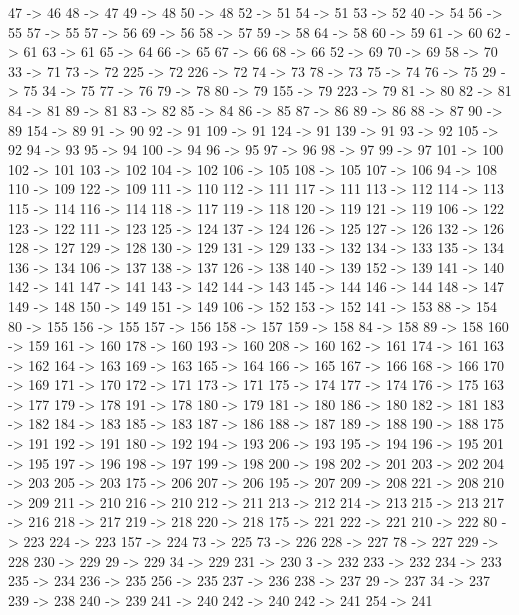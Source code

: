 {	47 -> 46
	48 -> 47
	49 -> 48
	50 -> 48
	52 -> 51
	54 -> 51
	53 -> 52
	40 -> 54
	56 -> 55
	57 -> 55
	57 -> 56
	69 -> 56
	58 -> 57
	59 -> 58
	64 -> 58
	60 -> 59
	61 -> 60
	62 -> 61
	63 -> 61
	65 -> 64
	66 -> 65
	67 -> 66
	68 -> 66
	52 -> 69
	70 -> 69
	58 -> 70
	33 -> 71
	73 -> 72
	225 -> 72
	226 -> 72
	74 -> 73
	78 -> 73
	75 -> 74
	76 -> 75
	29 -> 75
	34 -> 75
	77 -> 76
	79 -> 78
	80 -> 79
	155 -> 79
	223 -> 79
	81 -> 80
	82 -> 81
	84 -> 81
	89 -> 81
	83 -> 82
	85 -> 84
	86 -> 85
	87 -> 86
	89 -> 86
	88 -> 87
	90 -> 89
	154 -> 89
	91 -> 90
	92 -> 91
	109 -> 91
	124 -> 91
	139 -> 91
	93 -> 92
	105 -> 92
	94 -> 93
	95 -> 94
	100 -> 94
	96 -> 95
	97 -> 96
	98 -> 97
	99 -> 97
	101 -> 100
	102 -> 101
	103 -> 102
	104 -> 102
	106 -> 105
	108 -> 105
	107 -> 106
	94 -> 108
	110 -> 109
	122 -> 109
	111 -> 110
	112 -> 111
	117 -> 111
	113 -> 112
	114 -> 113
	115 -> 114
	116 -> 114
	118 -> 117
	119 -> 118
	120 -> 119
	121 -> 119
	106 -> 122
	123 -> 122
	111 -> 123
	125 -> 124
	137 -> 124
	126 -> 125
	127 -> 126
	132 -> 126
	128 -> 127
	129 -> 128
	130 -> 129
	131 -> 129
	133 -> 132
	134 -> 133
	135 -> 134
	136 -> 134
	106 -> 137
	138 -> 137
	126 -> 138
	140 -> 139
	152 -> 139
	141 -> 140
	142 -> 141
	147 -> 141
	143 -> 142
	144 -> 143
	145 -> 144
	146 -> 144
	148 -> 147
	149 -> 148
	150 -> 149
	151 -> 149
	106 -> 152
	153 -> 152
	141 -> 153
	88 -> 154
	80 -> 155
	156 -> 155
	157 -> 156
	158 -> 157
	159 -> 158
	84 -> 158
	89 -> 158
	160 -> 159
	161 -> 160
	178 -> 160
	193 -> 160
	208 -> 160
	162 -> 161
	174 -> 161
	163 -> 162
	164 -> 163
	169 -> 163
	165 -> 164
	166 -> 165
	167 -> 166
	168 -> 166
	170 -> 169
	171 -> 170
	172 -> 171
	173 -> 171
	175 -> 174
	177 -> 174
	176 -> 175
	163 -> 177
	179 -> 178
	191 -> 178
	180 -> 179
	181 -> 180
	186 -> 180
	182 -> 181
	183 -> 182
	184 -> 183
	185 -> 183
	187 -> 186
	188 -> 187
	189 -> 188
	190 -> 188
	175 -> 191
	192 -> 191
	180 -> 192
	194 -> 193
	206 -> 193
	195 -> 194
	196 -> 195
	201 -> 195
	197 -> 196
	198 -> 197
	199 -> 198
	200 -> 198
	202 -> 201
	203 -> 202
	204 -> 203
	205 -> 203
	175 -> 206
	207 -> 206
	195 -> 207
	209 -> 208
	221 -> 208
	210 -> 209
	211 -> 210
	216 -> 210
	212 -> 211
	213 -> 212
	214 -> 213
	215 -> 213
	217 -> 216
	218 -> 217
	219 -> 218
	220 -> 218
	175 -> 221
	222 -> 221
	210 -> 222
	80 -> 223
	224 -> 223
	157 -> 224
	73 -> 225
	73 -> 226
	228 -> 227
	78 -> 227
	229 -> 228
	230 -> 229
	29 -> 229
	34 -> 229
	231 -> 230
	3 -> 232
	233 -> 232
	234 -> 233
	235 -> 234
	236 -> 235
	256 -> 235
	237 -> 236
	238 -> 237
	29 -> 237
	34 -> 237
	239 -> 238
	240 -> 239
	241 -> 240
	242 -> 240
	242 -> 241
	254 -> 241
}
